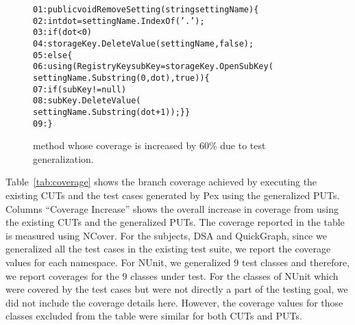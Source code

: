 \begin{figure}[t]
\begin{CodeOut}
\begin{alltt}
01: public void RemoveSetting( string settingName) \{
02: \hspace*{0.05in}int dot = settingName.IndexOf( '.' );
03: \hspace*{0.15in}if ( dot < 0 )
04: \hspace*{0.2in}storageKey.DeleteValue( settingName, false );
05: \hspace*{0.15in}else \{
06: \hspace*{0.2in}using(RegistryKey subKey=storageKey.OpenSubKey(
\hspace*{0.8in}settingName.Substring(0,dot),true))\{
07: \hspace*{0.3in}if ( subKey != null )
08: \hspace*{0.5in}subKey.DeleteValue(
\hspace*{1.0in}settingName.Substring(dot + 1)); \} \}
09: \hspace*{0.02in}\} 
\end{alltt}
\end{CodeOut}
\caption{ method whose coverage is increased by $60\%$ due to test generalization.}
\label{fig:excoverage}
\end{figure}

Table~\ref{tab:coverage} shows the branch coverage achieved by executing the existing CUTs and the test cases generated by Pex using the generalized PUTs. Columns ``Coverage Increase'' shows the overall increase in coverage from using the existing CUTs and the generalized PUTs.
The coverage reported in the table is measured using NCover. For the subjects, DSA and QuickGraph, since we generalized all the test cases in the existing test suite, we report the coverage values for each namespace. For NUnit, we generalized $9$ test classes and therefore, we report coverages for the $9$ classes under test. For the classes of NUnit which were covered by the test cases but were not directly a part of the testing goal, we did not include the coverage details here. However, the coverage values for those classes excluded from the table were similar for both CUTs and PUTs.  

